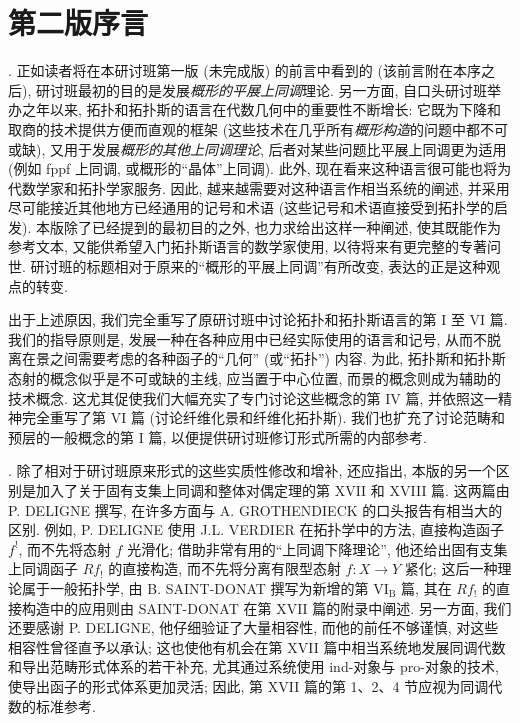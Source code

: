 \chapter*{第二版序言}

. 正如读者将在本研讨班第一版 (未完成版) 的前言中看到的
(该前言附在本序之后), 研讨班最初的目的是发展\emph{概形的平展上同调}理论.
另一方面, 自口头研讨班举办之年以来, 拓扑和拓扑斯的语言在代数几何中的重要性不断增长:
它既为下降和取商的技术提供方便而直观的框架
(这些技术在几乎所有\emph{概形构造}的问题中都不可或缺),
又用于发展\emph{概形的其他上同调理论},
后者对某些问题比平展上同调更为适用
(例如 fppf 上同调, 或概形的“晶体”上同调).
此外, 现在看来这种语言很可能也将为代数学家和拓扑学家服务.
因此, 越来越需要对这种语言作相当系统的阐述,
并采用尽可能接近其他地方已经通用的记号和术语
(这些记号和术语直接受到拓扑学的启发).
本版除了已经提到的最初目的之外, 也力求给出这样一种阐述,
使其既能作为参考文本, 又能供希望入门拓扑斯语言的数学家使用,
以待将来有更完整的专著问世.
研讨班的标题相对于原来的“概形的平展上同调”有所改变,
表达的正是这种观点的转变.

出于上述原因, 我们完全重写了原研讨班中讨论拓扑和拓扑斯语言的第 I 至 VI 篇.
我们的指导原则是, 发展一种在各种应用中已经实际使用的语言和记号,
从而不脱离在景之间需要考虑的各种函子的“几何” (或“拓扑”) 内容.
为此, 拓扑斯和拓扑斯态射的概念似乎是不可或缺的主线,
应当置于中心位置, 而景的概念则成为辅助的技术概念.
这尤其促使我们大幅充实了专门讨论这些概念的第 IV 篇,
并依照这一精神完全重写了第 VI 篇 (讨论纤维化景和纤维化拓扑斯).
我们也扩充了讨论范畴和预层的一般概念的第 I 篇,
以便提供研讨班修订形式所需的内部参考.

. 除了相对于研讨班原来形式的这些实质性修改和增补,
还应指出, 本版的另一个区别是加入了关于固有支集上同调和整体对偶定理的第 XVII 和 XVIII 篇.
这两篇由 P. DELIGNE 撰写, 在许多方面与 A. GROTHENDIECK 的口头报告有相当大的区别.
例如, P. DELIGNE 使用 J.L. VERDIER 在拓扑学中的方法,
直接构造函子 $f^!$, 而不先将态射 $f$ 光滑化;
借助非常有用的“上同调下降理论”, 他还给出固有支集上同调函子 $Rf_!$ 的直接构造,
而不先将分离有限型态射 $f:X\longrightarrow Y$ 紧化;
这后一种理论属于一般拓扑学, 由 B. SAINT-DONAT 撰写为新增的第 $\mathrm{VI}_{\mathrm B}$ 篇,
其在 $Rf_!$ 的直接构造中的应用则由 SAINT-DONAT 在第 XVII 篇的附录中阐述.
另一方面, 我们还要感谢 P. DELIGNE,
他仔细验证了大量相容性, 而他的前任不够谨慎, 对这些相容性曾径直予以承认;
这也使他有机会在第 XVII 篇中相当系统地发展同调代数和导出范畴形式体系的若干补充,
尤其通过系统使用 ind-对象与 pro-对象的技术, 使导出函子的形式体系更加灵活;
因此, 第 XVII 篇的第 1、2、4 节应视为同调代数的标准参考.

